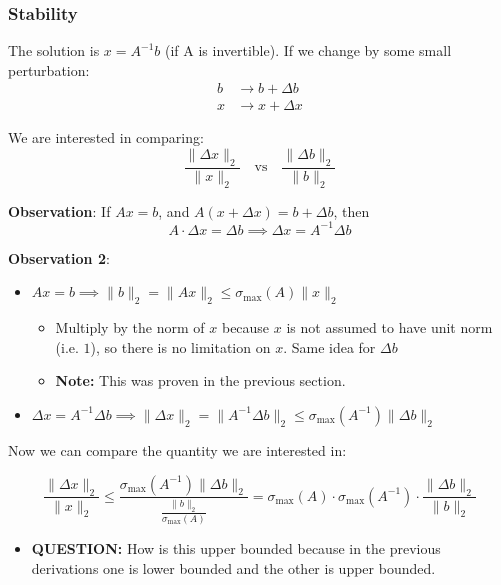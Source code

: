 \subsubsection{Stability}
\begin{derivation}
        The solution is \( x = A^{-1} b \) (if A is invertible). If we change by some small perturbation:
        \begin{align*}
        b &\rightarrow b + \Delta b \\
        x &\rightarrow x + \Delta x
        \end{align*}
    
        We are interested in comparing:
        \begin{equation*}
        \frac{\|\Delta x\|_2}{\|x\|_2} \quad \text{vs} \quad \frac{\|\Delta b\|_2}{\|b\|_2}
        \end{equation*}
        \vspace{1em}

    \textbf{Observation}: If \( Ax = b \), and \( A(x + \Delta x) = b + \Delta b \), then 
\[
A \cdot \Delta x = \Delta b \implies \Delta x = A^{-1} \Delta b
\]

\textbf{Observation 2}:
\begin{itemize}
    \item \( Ax = b \implies \| b \|_2 = \| A x \|_2 \leq \sigma_{\max}(A) \| x \|_2 \)
    \begin{itemize}
        \item Multiply by the norm of $x$ because $x$ is not assumed to have unit norm (i.e. $1$), so there is no limitation on $x$. Same idea for $\Delta b$
        \item \textbf{Note:} This was proven in the previous section.
    \end{itemize}
    \item \( \Delta x = A^{-1} \Delta b \implies \| \Delta x \|_2 = \| A^{-1} \Delta b \|_2 \leq \sigma_{\max}(A^{-1}) \| \Delta b \|_2 \)
\end{itemize}
\vspace{1em}

Now we can compare the quantity we are interested in: 

\begin{equation*}
    \frac{\|\Delta x\|_2}{\|x\|_2} \leq \frac{\sigma_{\max}(A^{-1}) \|\Delta b\|_2}{\frac{\|b\|_2}{\sigma_{\max}(A)}} 
    = \sigma_{\max}(A) \cdot \sigma_{\max}(A^{-1}) \cdot \frac{\|\Delta b\|_2}{\|b\|_2}
\end{equation*}
\begin{itemize}
    \item \textbf{QUESTION:} How is this upper bounded because in the previous derivations one is lower bounded and the other is upper bounded. 
\end{itemize}


\end{derivation}
